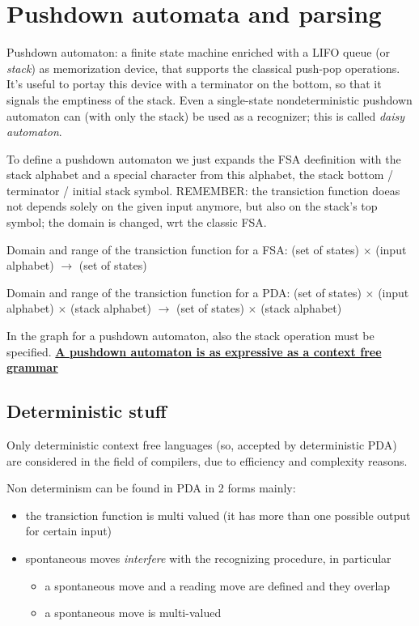 \chapter{Pushdown automata and parsing}
	Pushdown automaton: a finite state machine enriched with a LIFO queue (or \emph{stack}) as memorization device, that supports the classical push-pop operations. 
	It's useful to portay this device with a terminator on the bottom, so that it signals the emptiness of the stack. Even a single-state nondeterministic pushdown 
	automaton can (with only the stack) be used as a recognizer; this is called \emph{daisy automaton}.

	To define a pushdown automaton we just expands the FSA deefinition with the stack alphabet and a special character from this alphabet, the stack bottom / terminator 
	/ initial stack symbol. REMEMBER: the transiction function doeas not depends solely on the given input anymore, but also on the stack's top symbol; the domain is 
	changed, wrt the classic FSA.

	Domain and range of the transiction function for a FSA: (set of states) $\times$ (input alphabet) $\rightarrow$ (set of states)

	Domain and range of the transiction function for a PDA: (set of states) $\times$ (input alphabet) $\times$ (stack alphabet) $\rightarrow$ (set of states) 
	$\times$ (stack alphabet)

	In the graph for a pushdown automaton, also the stack operation must be specified.
	\textbf{\underline{A pushdown automaton is as expressive as a context free grammar}}
	
	\section{Deterministic stuff}
		Only deterministic context free languages (so, accepted by deterministic PDA) are considered in the field of compilers, due to efficiency and complexity 
		reasons.

		Non determinism can be found in PDA in 2 forms mainly:
		\begin{itemize}
			\item the transiction function is multi valued (it has more than one possible output for certain input)
			\item spontaneous moves \emph{interfere} with the recognizing procedure, in particular
				\begin{itemize}
					\item a spontaneous move and a reading move are defined and they overlap
					\item a spontaneous move is multi-valued
				\end{itemize}
		\end{itemize}
		
